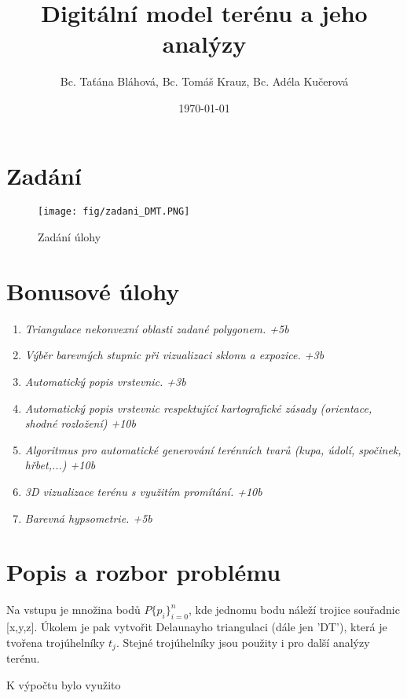 \documentclass[oneside,12pt,a4paper]{book}
\title{Digitální model terénu a jeho analýzy}
\author{Bc. Taťána Bláhová, Bc. Tomáš Krauz, Bc. Adéla Kučerová}
\date{\today} %
\begin{document}
\maketitle

    \vspace{-2cm}
    \vfill
    \begingroup
    
    \tableofcontents
    \vspace{-0.5cm}
    \printglossary[type=\acronymtype,title=\Large Acronyms]
    \endgroup
    \vspace{-1cm}
% 


\clearpage
\chapter{Zadání}

\begin{figure}[ht!]
    \centering
    \texttt{[image: fig/zadani\_DMT.PNG]}
    \caption{Zadání úlohy}
    \label{fig:Zadání úlohy}
\end{figure}



\chapter{Bonusové úlohy} 
\begin{enumerate}
    \item \emph{Triangulace nekonvexní oblasti zadané polygonem. +5b}
    \item \emph{Výběr barevných stupnic při vizualizaci sklonu a expozice. +3b}
    \item \emph{Automatický popis vrstevnic.    +3b}
    \item \emph{Automatický popis vrstevnic respektující kartografické zásady (orientace, shodné rozložení)     +10b}
    \item \emph{Algoritmus pro automatické generování terénních tvarů (kupa, údolí, spočinek, hřbet,...)       +10b}
    \item \emph{3D vizualizace terénu s využitím promítání. +10b}
    \item \emph{Barevná hypsometrie.    +5b}
\end{enumerate}


\chapter{Popis a rozbor problému} 
Na vstupu je množina bodů \emph{$P\{p_i\}^n_{i=0}$}, kde jednomu bodu náleží trojice souřadnic [x,y,z].
Úkolem je pak vytvořit Delaunayho triangulaci (dále jen 'DT'), která je tvořena trojúhelníky \emph{$t_j$}. Stejné trojúhelníky jsou použity i pro další analýzy terénu.\par
K výpočtu bylo využito \cite{dmt}
\end{document}
